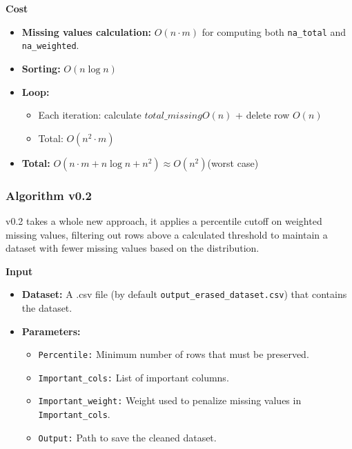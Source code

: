 \documentclass[a4paper,12pt]{article}
\begin{document}
\textbf{Cost}
\begin{itemize}
    \item \textbf{Missing values calculation:} $O(n \cdot m)$ for computing both \texttt{na\_total} and \texttt{na\_weighted}.
    \item \textbf{Sorting:} $O(n \log n)$
    \item \textbf{Loop:} 
        \begin{itemize}
            \item Each iteration: calculate $total\_missing O(n)$ + delete row $O(n)$
            \item Total: $O(n^2 \cdot m)$
        \end{itemize}
    \item \textbf{Total:} $O(n \cdot m + n \log n + n^2) \approx O(n^2)$(worst case)
\end{itemize}


\subsubsection{Algorithm v0.2}
v0.2 takes a whole new approach, it applies a percentile cutoff on weighted missing values, filtering out rows above a calculated threshold to maintain a dataset with fewer missing values based on the distribution.

\textbf{Input}
\begin{itemize}
    \item \textbf{Dataset:} A .csv file (by default \texttt{output\_erased\_dataset.csv}) that contains the dataset.
    \item \textbf{Parameters:}
    \begin{itemize}
        \item \texttt{Percentile:} Minimum number of rows that must be preserved.
        \item \texttt{Important\_cols:} List of important columns.
        \item \texttt{Important\_weight:} Weight used to penalize missing values in \texttt{Important\_cols}.
        \item \texttt{Output:} Path to save the cleaned dataset.
    \end{itemize}
\end{itemize}
\end{document}
